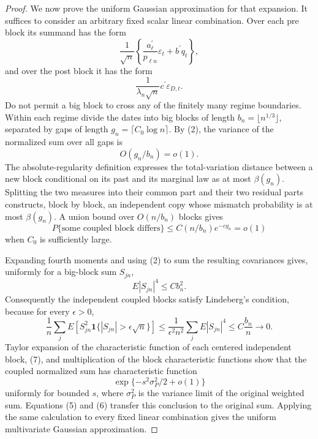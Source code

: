 \documentclass{article}
\begin{document}
\begin{proof}
We now prove the uniform Gaussian approximation for that expansion.  It suffices to consider an arbitrary fixed scalar linear combination.  Over each pre block its summand has the form
\[
\frac1{\sqrt n}
\left\{\frac{a_\ell^{\prime}}{p_{\ell n}}\varepsilon_t
+b^{\prime}q_t\right\},
\]
and over the post block it has the form
\[
\frac1{\lambda_n\sqrt n}c^{\prime}\varepsilon_{D,t}.
\]
Do not permit a big block to cross any of the finitely many regime boundaries.  Within each regime divide the dates into big blocks of length \(b_n=\lfloor n^{1/3}\rfloor\), separated by gaps of length \(g_n=\lceil C_0\log n\rceil\).  By (2), the variance of the normalized sum over all gaps is
\[
O(g_n/b_n)=o(1).
\tag{5}
\]
The absolute-regularity definition expresses the total-variation distance between a new block conditional on its past and its marginal law as at most \(\beta(g_n)\).  Splitting the two measures into their common part and their two residual parts constructs, block by block, an independent copy whose mismatch probability is at most \(\beta(g_n)\).  A union bound over \(O(n/b_n)\) blocks gives
\[
P\{\text{some coupled block differs}\}
\leq C(n/b_n)e^{-c g_n}=o(1)
\tag{6}
\]
when \(C_0\) is sufficiently large.

Expanding fourth moments and using (2) to sum the resulting covariances gives, uniformly for a big-block sum \(S_{jn}\),
\[
E|S_{jn}|^4\leq Cb_n^2.
\]
Consequently the independent coupled blocks satisfy Lindeberg's condition, because for every \(\epsilon>0\),
\[
\frac1n\sum_j
E\!\left[S_{jn}^2
\mathbf 1\{|S_{jn}|>\epsilon\sqrt n\}\right]
\leq\frac1{\epsilon^2n^2}\sum_jE|S_{jn}|^4
\leq C\frac{b_n}{n}\longrightarrow0.
\tag{7}
\]
Taylor expansion of the characteristic function of each centered independent block, (7), and multiplication of the block characteristic functions show that the coupled normalized sum has characteristic function
\[
\exp\{-s^2\sigma_P^2/2+o(1)\}
\]
uniformly for bounded \(s\), where \(\sigma_P^2\) is the variance limit of the original weighted sum.  Equations (5) and (6) transfer this conclusion to the original sum.  Applying the same calculation to every fixed linear combination gives the uniform multivariate Gaussian approximation.


\end{proof}
\end{document}

